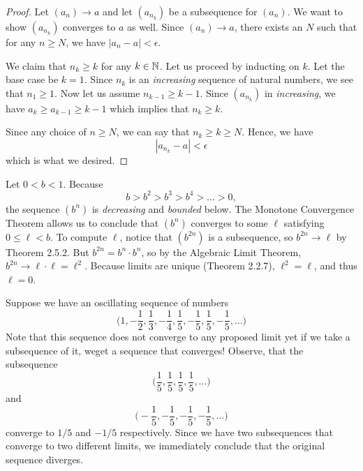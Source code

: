 \begin{proof}
    Let \( (a_n) \to a \) and let \( (a_{n_k})\) be a subsequence for \( (a_n)\). We want to show \( (a_{n_k})\) converges to \( a \) as well. Since \( (a_n) \to a\), there exists an \( N \) such that for any \( n \geq N \), we have \( |a_n - a| < \epsilon \). 

    We claim that \( n_{k} \geq k \) for any \( k \in \mathbb{N}\). Let us proceed by inducting on \( k \). Let the base case be \( k = 1 \). Since \(n_k\) is an \textit{increasing} sequence of natural numbers, we see that \( n_1 \geq 1\). Now let us assume \(n_{k-1} \geq k - 1\). Since \( (a_{n_k})\) in \textit{increasing}, we have \( a_k \geq a_{k-1} \geq k - 1\) which implies that \( n_k \geq k \). 

    Since any choice of \( n \geq N \), we can say that \( n_k \geq k \geq N \). Hence, we have 
    \[ |a_{n_k} - a| < \epsilon \]
which is what we desired.
\end{proof}

\begin{example}{}{}
Let \(0 < b < 1\). Because 
\[ b > b^2 > b^3 > b^4 > ... > 0,\]
the sequence \((b^n)\) is \textit{decreasing} and \textit{bounded} below. The Monotone Convergence Theorem allows us to conclude that \((b^n)\) converges to some \(\ell\) satisfying \( 0 \leq \ell < b\). To compute \(\ell\), notice that \((b^{2n})\) is a subsequence, so \(b^{2n} \to \ell\) by Theorem 2.5.2. But \( b^{2n} = b^n \cdot b^n\), so by the Algebraic Limit Theorem, \(b^{2n} \to \ell \cdot \ell = \ell^2 \). Because limits are unique (Theorem 2.2.7), \( \ell^2 = \ell\), and thus \( \ell = 0\). 

\end{example}










\begin{example}{}{}
Suppose we have an oscillating sequence of numbers 
\[ \Big( 1, -\frac{1}{2}, \frac{1}{3}, - \frac{1}{4}, \frac{1}{5}, -\frac{1}{5}, \frac{1}{5}, -\frac{1}{5},... \Big)\]
Note that this sequence does not converge to any proposed limit yet if we take a subsequence of it, weget a sequence that converges! Observe, that the subsequence 
\[ \Big(\frac{1}{5}, \frac{1}{5}, \frac{1}{5}, \frac{1}{5},... \Big)\]
and
\[ \Big(-\frac{1}{5}, -\frac{1}{5}, -\frac{1}{5}, -\frac{1}{5},... \Big)\]
converge to \( 1 / 5 \) and \(- 1 / 5\) respectively. Since we have two subsequences that converge to two different limits, we immediately conclude that the original sequence diverges.
\end{example}

